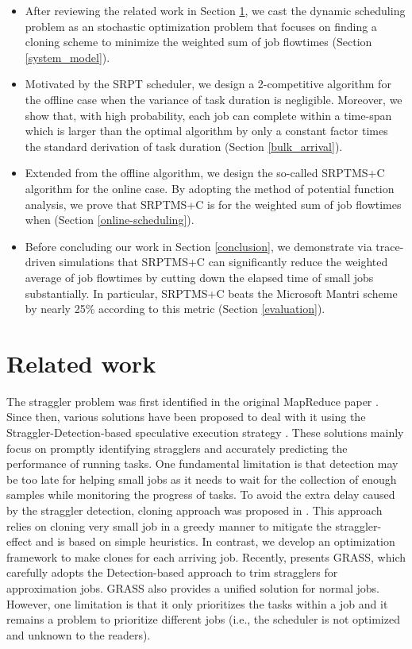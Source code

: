 \documentclass[10pt,conference,compsocconf,letterpaper]{IEEEtran}
\begin{document}
\begin{itemize}
\item After reviewing the related work in Section \ref{related_work}, we cast the dynamic scheduling problem as an stochastic optimization problem that focuses on finding a cloning scheme to minimize the weighted sum of job flowtimes (Section \ref{system_model}).
\item Motivated by the SRPT scheduler, we design a 2-competitive algorithm for the offline case when the variance of task duration is negligible. Moreover, we show that,
with high probability, each job can complete within a time-span which is larger than the optimal algorithm by only a constant factor times the standard derivation of task duration (Section \ref{bulk_arrival}).
\item Extended from the offline algorithm, we design the so-called SRPTMS+C algorithm for the online case.
By adopting the method of potential function analysis,
we prove that SRPTMS+C is   for the weighted sum of job
flowtimes when  (Section \ref{online-scheduling}).
\item Before concluding our work in Section \ref{conclusion},  we demonstrate via trace-driven simulations that SRPTMS+C can significantly reduce the weighted average of job flowtimes by cutting down the elapsed time of small jobs substantially. In particular, SRPTMS+C beats the Microsoft Mantri scheme by nearly 25\% according to this metric (Section \ref{evaluation}). 
\end{itemize}



\section{Related work}
\label{related_work}
The straggler problem was first identified in the original MapReduce paper \cite{mapreduce:google}. Since then, various solutions have been proposed to deal with it using the
Straggler-Detection-based  speculative execution strategy \cite{Dryad,Performance,Outliers,Smart_Speculative}. These solutions mainly focus on promptly identifying
 stragglers and accurately predicting the performance of running tasks.  One fundamental limitation is that detection may be too late for helping small jobs as it needs to wait for the collection of enough samples while monitoring the progress of tasks. To avoid the extra delay caused by the straggler detection, cloning approach was proposed in \cite{Cloning}. This approach
 relies on cloning very small job in a greedy manner to mitigate the straggler-effect and is based on simple heuristics. In contrast, we develop an optimization framework to make clones for each arriving job. Recently, \cite{grass} presents GRASS, which carefully adopts the Detection-based approach to trim stragglers for approximation jobs. GRASS also provides a unified solution for normal jobs. However, one limitation is that it only prioritizes the tasks within a job and it remains a problem to prioritize different jobs (i.e., the scheduler is not optimized and unknown to the readers).
\end{document}
